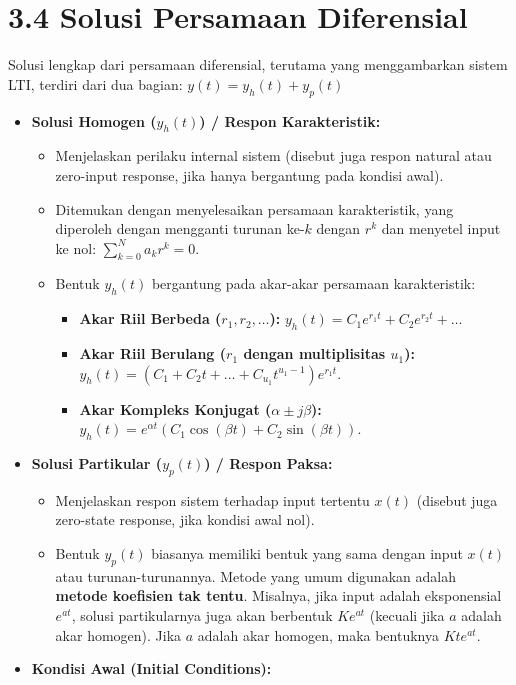 \documentclass[
  letterpaper,
  DIV=11,
  numbers=noendperiod]{scrreprt}
\providecommand{\tightlist}{%
  \setlength{\itemsep}{0pt}\setlength{\parskip}{0pt}}
\begin{document}
\section{3.4 Solusi Persamaan
Diferensial}\label{solusi-persamaan-diferensial}

Solusi lengkap dari persamaan diferensial, terutama yang menggambarkan
sistem LTI, terdiri dari dua bagian: \(y(t) = y_h(t) + y_p(t)\)

\begin{itemize}
\tightlist
\item
  \textbf{Solusi Homogen (\(y_h(t)\)) / Respon Karakteristik:}

  \begin{itemize}
  \tightlist
  \item
    Menjelaskan perilaku internal sistem (disebut juga respon natural
    atau zero-input response, jika hanya bergantung pada kondisi awal).
  \item
    Ditemukan dengan menyelesaikan persamaan karakteristik, yang
    diperoleh dengan mengganti turunan ke-\(k\) dengan \(r^k\) dan
    menyetel input ke nol: \(\sum_{k=0}^{N} a_k r^k = 0\).
  \item
    Bentuk \(y_h(t)\) bergantung pada akar-akar persamaan karakteristik:

    \begin{itemize}
    \tightlist
    \item
      \textbf{Akar Riil Berbeda (\(r_1, r_2, \dots\)):}
      \(y_h(t) = C_1 e^{r_1 t} + C_2 e^{r_2 t} + \dots\)
    \item
      \textbf{Akar Riil Berulang (\(r_1\) dengan multiplisitas
      \(u_1\)):}
      \(y_h(t) = (C_1 + C_2 t + \dots + C_{u_1} t^{u_1-1}) e^{r_1 t}\).
    \item
      \textbf{Akar Kompleks Konjugat (\(\alpha \pm j\beta\)):}
      \(y_h(t) = e^{\alpha t}(C_1 \cos(\beta t) + C_2 \sin(\beta t))\).
    \end{itemize}
  \end{itemize}
\item
  \textbf{Solusi Partikular (\(y_p(t)\)) / Respon Paksa:}

  \begin{itemize}
  \tightlist
  \item
    Menjelaskan respon sistem terhadap input tertentu \(x(t)\) (disebut
    juga zero-state response, jika kondisi awal nol).
  \item
    Bentuk \(y_p(t)\) biasanya memiliki bentuk yang sama dengan input
    \(x(t)\) atau turunan-turunannya. Metode yang umum digunakan adalah
    \textbf{metode koefisien tak tentu}. Misalnya, jika input adalah
    eksponensial \(e^{at}\), solusi partikularnya juga akan berbentuk
    \(K e^{at}\) (kecuali jika \(a\) adalah akar homogen). Jika \(a\)
    adalah akar homogen, maka bentuknya \(K t e^{at}\).
  \end{itemize}
\item
  \textbf{Kondisi Awal (Initial Conditions):}


\end{itemize}
\end{document}
